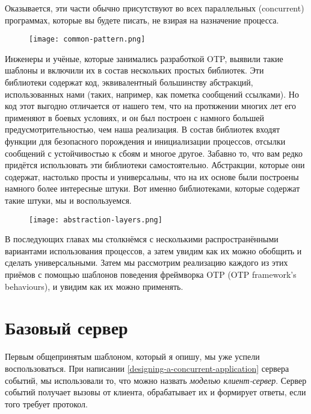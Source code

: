 Оказывается, эти части обычно присутствуют во всех параллельных (concurrent) программах, которые вы будете писать, не взирая на назначение процесса.
\begin{figure}[h!]
    \centering
    \texttt{[image: common-pattern.png]}
\end{figure}

Инженеры и учёные, которые занимались разработкой OTP, выявили такие шаблоны и включили их в состав нескольких простых библиотек.
Эти библиотеки содержат код, эквивалентный большинству абстракций, использованных нами (таких, например, как пометка сообщений ссылками).
Но код этот выгодно отличается от нашего тем, что на протяжении многих лет его применяют в боевых условиях, и он был построен с намного большей предусмотрительностью, чем наша реализация.
В состав библиотек входят функции для безопасного порождения и инициализации процессов, отсылки сообщений с устойчивостью к сбоям и многое другое.
Забавно то, что вам редко придётся использовать эти библиотеки самостоятельно.
Абстракции, которые они содержат, настолько просты и универсальны, что на их основе были построены намного более интересные штуки.
Вот именно библиотеками, которые содержат такие штуки, мы и воспользуемся.
\begin{figure}[h!]
    \centering
    \texttt{[image: abstraction-layers.png]}
\end{figure}
В последующих главах мы столкнёмся с несколькими распространёнными вариантами использования процессов, а затем увидим как их можно обобщить и сделать универсальными.
Затем мы рассмотрим реализацию каждого из этих приёмов с помощью шаблонов поведения фреймворка OTP (OTP framework's behaviours), и увидим как их можно применять.
\section{Базовый сервер}
\label{the-basic-server}
Первым общепринятым шаблоном, который я опишу, мы уже успели воспользоваться.
При написании \ref{designing-a-concurrent-application} сервера событий, мы использовали то, что можно назвать \emph{моделью клиент\--сервер}.
Сервер событий получает вызовы от клиента, обрабатывает их и формирует ответы, если того требует протокол.

